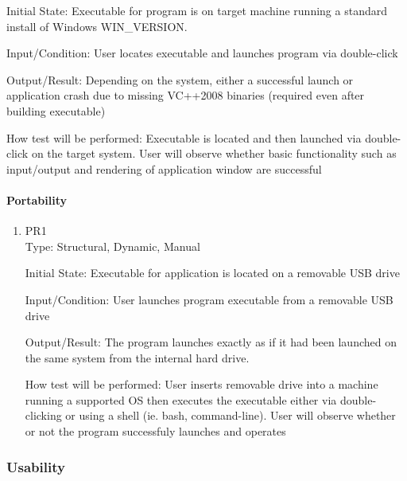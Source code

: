 \documentclass[12pt, titlepage]{article}
\begin{document}
\begin{enumerate}
		Initial State: Executable for program is on target machine running a
		standard install of Windows WIN\_VERSION.
		
		Input/Condition: User locates executable and launches program via double-click
		
		Output/Result: Depending on the system, either a successful launch or
		application crash due to missing VC++2008 binaries (required even after 
		building executable)
		
		How test will be performed: Executable is located and then launched via
		double-click on the target system. User will observe whether basic
		functionality such as input/output and rendering of application window are
		successful


	\end{enumerate}

	\paragraph{Portability}
	\begin{enumerate}
		\item{PR1\\}
		Type: Structural, Dynamic, Manual
		
		Initial State: Executable for application is located on a removable USB drive
		
		Input/Condition: User launches program executable from a removable USB drive
		
		Output/Result: The program launches exactly as if it had been launched on
		the same system from the internal hard drive.
		
		How test will be performed: User inserts removable drive into a machine running a
		supported OS then executes the executable either via double-clicking or using
		a shell (ie. bash, command-line). User will observe whether or not the program
		successfuly launches and operates
	\end{enumerate}

	\subsubsection{Usability}
\end{document}
